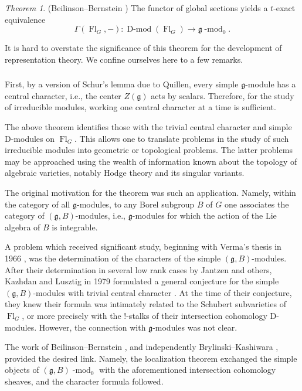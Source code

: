 \documentclass[10pt]{amsart}
\newcommand{\sB}{\on{Fl}_G}
\newcommand{\fg}{\mathfrak{g}}
\newcommand{\on}{\operatorname}
\renewcommand{\mod}{\on{-mod}}
\newcommand{\Dmod}{\on{D-mod}}
\theoremstyle{remark}
\newtheorem{theo}[subsubsection]{Theorem}
\numberwithin{equation}{section}
\renewcommand{\mod}{\operatorname{-mod}}
\begin{document}
	\begin{theo} \label{t:bbloc}(Beilinson--Bernstein \cite{beilinson-bernstein81}) The functor of global sections yields 
	a $t$-exact equivalence 
		\[
		\Gamma(\sB, -): \Dmod(\sB) \rightarrow \fg\on{-mod}_0.       
		\]
	\end{theo}
	
	
	It is hard to overstate the significance of this theorem for the 
	development of representation theory. We confine ourselves here to a few 
	remarks. 
	
	\subsubsection{} First, by a version of Schur's lemma due to Quillen, every 
	simple $\fg$-module has a central character, i.e., the center $Z(\fg)$ acts 
	by scalars. Therefore, for the study of irreducible modules, working one 
	central character at a time is sufficient.
	
	The above theorem identifies those with the trivial central character and 
	simple D-modules on $\sB$. This allows one to translate problems in the study of such irreducible modules into geometric or topological problems. The latter problems may be approached 
	using the wealth of information known about the topology of algebraic 
	varieties, notably Hodge theory and its singular variants. 
	
	The original motivation for the theorem was such an application. Namely, 
	within the category of all $\fg$-modules, to any Borel subgroup $B$ of $G$ 
	one associates the category of $(\fg, B)$-modules, i.e., $\fg$-modules for 
	which the action of the Lie algebra of $B$ is integrable. 
	
	A problem which received significant study, beginning with Verma's thesis in 1966 \cite{verma66}, was the determination of the characters of the simple $(\fg, 
	B)$-modules. After their determination in several low rank cases by Jantzen \cite{jantz79} 
	and others, Kazhdan and Lusztig in 1979 formulated a general conjecture for 
	the simple $(\fg,B)$-modules with trivial central character \cite{kl79}. At the time of 
	their conjecture, they knew their formula was intimately related to the 
	Schubert subvarieties of $\sB$, or more precisely with the $!$-stalks of 
	their intersection cohomology D-modules. However, the connection with $\fg$-modules was not clear. 
	
	The work of Beilinson--Bernstein \cite{bb82}, and independently Brylinski--Kashiwara \cite{brylin81}, 
	provided the desired link. Namely, the localization theorem exchanged the 
	simple objects of $(\fg,B)\mod_0$ with the aforementioned intersection 
	cohomology sheaves, and the character formula followed. 
	
\end{document}

